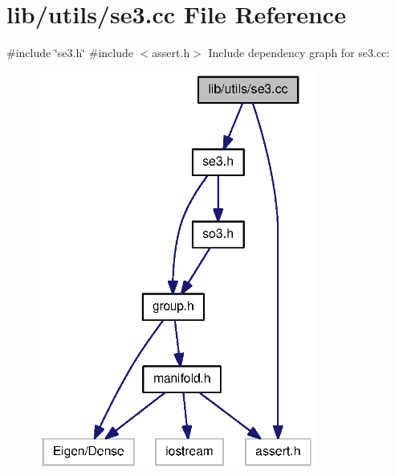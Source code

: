 \section{lib/utils/se3.cc \-File \-Reference}
\label{se3_8cc}
{\ttfamily \#include \char`\"{}se3.\-h\char`\"{}}\*
{\ttfamily \#include $<$assert.\-h$>$}\*
\-Include dependency graph for se3.\-cc\-:\nopagebreak
\begin{figure}[H]
\begin{center}
\leavevmode
\includegraphics[width=258pt]{se3_8cc__incl}
\end{center}
\end{figure}
